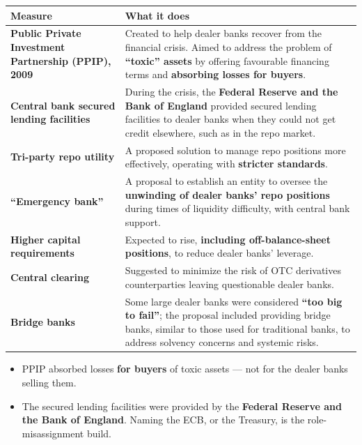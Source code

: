 \begin{center}
\small
\begin{tabularx}{\textwidth}{@{}p{3.8cm} X@{}}
\toprule
\rowcolor{FRMSoft}\textbf{Measure} & \textbf{What it does} \\
\midrule
\textbf{Public Private Investment Partnership (PPIP), 2009} &
Created to help dealer banks recover from the financial crisis. Aimed to address the problem of \textbf{``toxic'' assets} by offering favourable financing terms and \textbf{absorbing losses for buyers}. \\
\addlinespace
\textbf{Central bank secured lending facilities} &
During the crisis, the \textbf{Federal Reserve and the Bank of England} provided secured lending facilities to dealer banks when they could not get credit elsewhere, such as in the repo market. \\
\addlinespace
\textbf{Tri-party repo utility} &
A proposed solution to manage repo positions more effectively, operating with \textbf{stricter standards}. \\
\addlinespace
\textbf{``Emergency bank''} &
A proposal to establish an entity to oversee the \textbf{unwinding of dealer banks' repo positions} during times of liquidity difficulty, with central bank support. \\
\addlinespace
\textbf{Higher capital requirements} &
Expected to rise, \textbf{including off-balance-sheet positions}, to reduce dealer banks' leverage. \\
\addlinespace
\textbf{Central clearing} &
Suggested to minimize the risk of OTC derivatives counterparties leaving questionable dealer banks. \\
\addlinespace
\textbf{Bridge banks} &
Some large dealer banks were considered \textbf{``too big to fail''}; the proposal included providing bridge banks, similar to those used for traditional banks, to address solvency concerns and systemic risks. \\
\bottomrule
\end{tabularx}
\end{center}

\begin{lrtrapbox}
\begin{itemize}
\item PPIP absorbed losses \textbf{for buyers} of toxic assets --- not for the dealer banks selling them.
\item The secured lending facilities were provided by the \textbf{Federal Reserve and the Bank of England}. Naming the ECB, or the Treasury, is the role-misassignment build.
\end{itemize}
\end{lrtrapbox}

